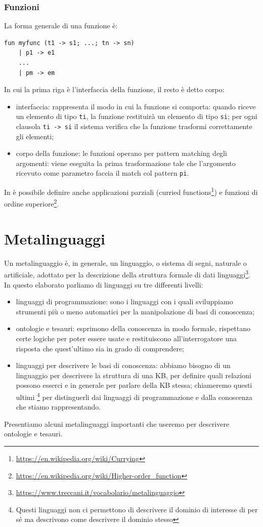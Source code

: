\subsubsection{Funzioni}
La forma generale di una funzione è:
\begin{verbatim}
fun myfunc (t1 -> s1; ...; tn -> sn)
	| p1 -> e1
	...
	| pm -> em
\end{verbatim}
In cui la prima riga è l'interfaccia della funzione, il resto è detto corpo:
\begin{itemize}
	\item interfaccia: rappresenta il modo in cui la funzione si comporta: quando riceve un elemento di tipo \verb|ti|, la funzione restituirà un elemento di tipo \verb|si|; per ogni clausola \verb|ti -> si| il sistema verifica che la funzione trasformi correttamente gli elementi;
	\item corpo della funzione: le funzioni operano per pattern matching degli argomenti: viene eseguita la prima trasformazione tale che l'argomento ricevuto come parametro faccia il match col pattern \verb|pi|. 
\end{itemize}
In \cduce è possibile definire anche applicazioni parziali (curried functions\footnote{\url{https://en.wikipedia.org/wiki/Currying}}) e funzioni di ordine superiore\footnote{\url{https://en.wikipedia.org/wiki/Higher-order\_function}}.
\section{Metalinguaggi}
Un metalinguaggio è, in generale, un linguaggio, o sistema di segni, naturale o artificiale, adottato per la descrizione della struttura formale di dati linguaggi\footnote{\url{https://www.treccani.it/vocabolario/metalinguaggio}}. In questo elaborato parliamo di linguaggi su tre differenti livelli:
\begin{itemize}
	\item linguaggi di programmazione: sono i linguaggi con i quali sviluppiamo strumenti più o meno automatici per la manipolazione di basi di conoscenza;
	\item ontologie e tesauri: esprimono della conoscenza in modo formale, rispettano certe logiche per poter essere usate e restituiscono all'interrogatore una risposta che quest'ultimo sia in grado di comprendere;
	\item linguaggi per descrivere le basi di conoscenza: abbiamo bisogno di un linguaggio per descrivere la struttura di una KB, per definire quali relazioni possono esserci e in generale per parlare della KB stessa; chiameremo questi ultimi \footnote{Questi linguaggi non ci permettono di descrivere il dominio di interesse di per sé ma descrivono come descrivere il dominio stesso} per distinguerli dai linguaggi di programmazione e dalla conoscenza che stiamo rappresentando.
\end{itemize}
Presentiamo alcuni metalinguaggi importanti che useremo per descrivere ontologie e tesauri.
